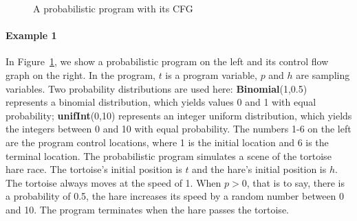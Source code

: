 \documentclass[runningheads]{llncs}
\begin{document}
\begin{figure}[htbp]
	\vspace{-0.5cm}  %
	\centering %
	\caption{A probabilistic program with its CFG} %
	\label{example1} %
\end{figure}

\paragraph{Example 1} In Figure~\ref{example1}, we show a probabilistic program on the left and its control flow graph on the right. In the program,  $t$ is a program variable,  $p$ and $h$ are sampling variables. Two probability distributions are used here: \textbf{Binomial}(1,0.5) represents a binomial distribution, which yields values 0 and 1 with equal probability; \textbf{unifInt}(0,10) represents an integer uniform distribution, which yields the integers between 0 and 10  with equal probability. The numbers 1-6 on the left are the program control locations, where 1 is the initial location and 6 is the terminal location. The probabilistic program simulates a scene of the tortoise hare race. The tortoise's initial position is $t$ and the hare's initial position is $h$.  The tortoise  always moves at the speed of 1. When $p>0$, that is to say, there is a probability of 0.5, the hare increases its speed by a random number between 0 and 10. The program terminates when the hare passes the tortoise.
\end{document}
